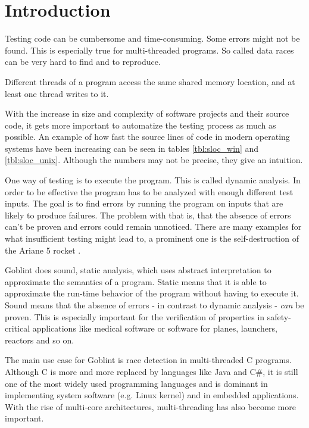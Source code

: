 \chapter{Introduction}
\label{chap:introduction}
Testing code can be cumbersome and time-consuming. Some errors might not be found. This is especially true for multi-threaded programs. So called data races can be very hard to find and to reproduce.

\begin{definition}
 Different threads of a program access the same shared memory location, and at least one thread writes to it.
\end{definition}

With the increase in size and complexity of software projects and their source code, it gets more important to automatize the testing process as much as possible. An example of how fast the source lines of code in modern operating systems have been increasing can be seen in tables \ref{tbl:sloc_win} and \ref{tbl:sloc_unix}. Although the numbers may not be precise, they give an intuition.



One way of testing is to execute the program. This is called dynamic analysis. In order to be effective the program has to be analyzed with enough different test inputs. The goal is to find errors by running the program on inputs that are likely to produce failures. The problem with that is, that the absence of errors can't be proven and errors could remain unnoticed. There are many examples for what insufficient testing might lead to, a prominent one is the self-destruction of the Ariane 5 rocket \cite{Dowson:1997:ASF:251880.251992}.

Goblint does sound, static analysis, which uses abstract interpretation to approximate the semantics of a program. Static means that it is able to approximate the run-time behavior of the program without having to execute it. Sound means that the absence of errors - in contrast to dynamic analysis - \textit{can} be proven. This is especially important for the verification of properties in safety-critical applications like medical software or software for planes, launchers, reactors and so on.

The main use case for Goblint is race detection in multi-threaded C programs. Although C is more and more replaced by languages like Java and C\#, it is still one of the most widely used programming languages and is dominant in implementing system software (e.g. Linux kernel) and in embedded applications. With the rise of multi-core architectures, multi-threading has also become more important.

